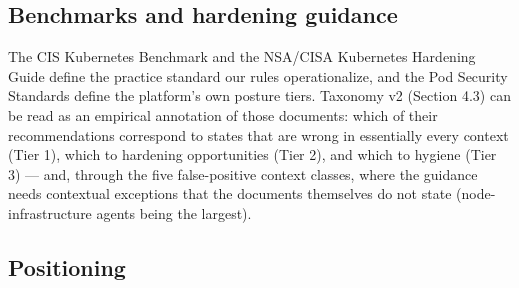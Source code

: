 \documentclass[pdflatex,sn-basic]{sn-jnl}
\begin{document}
\hypertarget{benchmarks-and-hardening-guidance}{%
\subsection{Benchmarks and hardening
guidance}\label{benchmarks-and-hardening-guidance}}

The CIS Kubernetes Benchmark and the NSA/CISA Kubernetes Hardening Guide
define the practice standard our rules operationalize, and the Pod
Security Standards define the platform's own posture tiers. Taxonomy v2
(Section 4.3) can be read as an empirical annotation of those documents:
which of their recommendations correspond to states that are wrong in
essentially every context (Tier 1), which to hardening opportunities
(Tier 2), and which to hygiene (Tier 3) --- and, through the five
false-positive context classes, where the guidance needs contextual
exceptions that the documents themselves do not state
(node-infrastructure agents being the largest).

\hypertarget{positioning}{%
\subsection{Positioning}\label{positioning}}
\end{document}
